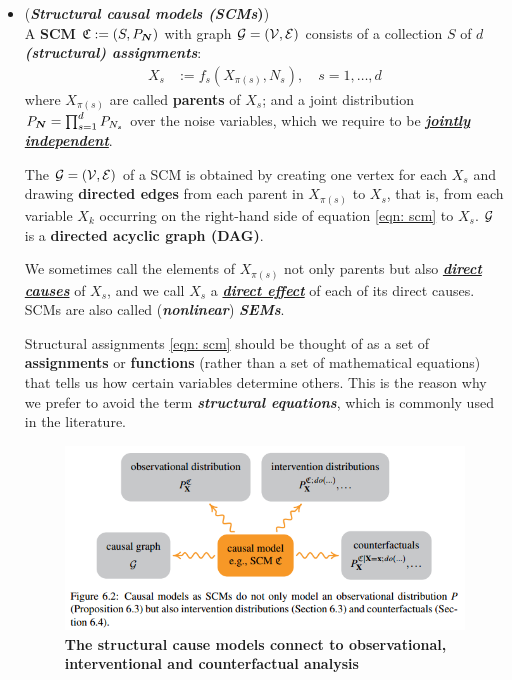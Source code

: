 \documentclass[11pt]{article}
\begin{document}
\begin{itemize}
\item  \begin{definition} (\textbf{\emph{Structural causal models (SCMs})}) \citep{peters2017elements}\\
A \textbf{SCM} $\mathfrak{C}:= (S, P_{\boldsymbol{N}})$ with graph ${\mathcal G}=({\mathcal V}, {\mathcal E})$ consists of a collection $S$ of $d$ \emph{\textbf{(structural) assignments}}:
\begin{align}
X_{s} &:= f_{s}(X_{\pi(s)}, N_s), \quad s=1,\ldots, d \label{eqn: scm}
\end{align} where $X_{\pi(s)}$ are called \textbf{parents} of $X_s$; and a joint distribution $P_{\boldsymbol{N}} = \prod_{s=1}^{d}P_{N_{s}}$ over the noise variables, which we require to be \underline{\emph{\textbf{jointly independent}}}.

The ${\mathcal G}=({\mathcal V}, {\mathcal E})$ of a SCM is obtained by creating one vertex for each $X_s$ and drawing \textbf{directed edges} from each parent in $X_{\pi(s)}$ to $X_s$, that is, from each variable $X_k$ occurring on the right-hand side of equation \eqref{eqn: scm} to $X_s$. ${\mathcal G}$ is a  \textbf{directed acyclic graph (DAG)}.

We sometimes call the elements of $X_{\pi(s)}$ not only parents but also \underline{\textbf{\emph{direct causes}}} of $X_s$, and we call $X_s$ a \underline{\textbf{\emph{direct effect}}} of each of its direct causes. SCMs are also called (\textbf{\emph{nonlinear}}) \textbf{\emph{SEMs}}.
\end{definition}

Structural assignments \eqref{eqn: scm} should be thought of as a set of \textbf{assignments} or \textbf{functions} (rather than a set of mathematical equations) that tells us how certain variables determine others. This is the reason why we prefer to avoid the term \emph{\textbf{structural equations}}, which is commonly used in the literature.

\begin{figure}
\begin{minipage}[t]{1\linewidth}
  \centering
  \centerline{\includegraphics[scale = 0.6]{scm_causal_observe_intervene_counter.png}}
\end{minipage}
\caption{\footnotesize{\textbf{The structural cause models connect to observational, interventional and counterfactual analysis \citep{peters2017elements}}}}
\label{fig: scm_causal_observe_intervene_counter}
\end{figure}


\end{itemize}
\end{document}
